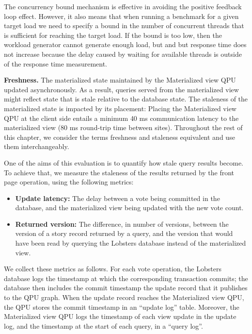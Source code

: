 The concurrency bound mechanism is effective in avoiding the positive feedback loop effect.
However, it also means that when running a benchmark for a given target load we need to specify a bound in the number of
concurrent threads that is sufficient for reaching the target load.
If the bound is too low, then the workload generator cannot generate enough load, but and but response time does not
increase because the delay caused by waiting for available threads is outside of the response time measurement.

\bigskip
\noindent
\textbf{Freshness.} The materialized state maintained by the Materialized view QPU updated asynchronously.
As a result, queries served from the materialized view might reflect state that is stale relative to the database state.
The staleness of the materialized state is impacted by its placement:
Placing the Materialized view QPU at the client side entails a minimum 40 ms communication latency to the materialized view
(80 ms round-trip time between sites).
Throughout the rest of this chapter, we consider the terms freshness and staleness equivalent and use them interchangeably.

One of the aims of this evaluation is to quantify how stale query results become.
To achieve that, we measure the staleness of the results returned by the front page operation,
using the following metrics:
\begin{itemize}
  \item \textbf{Update latency:} The delay between a vote being committed in the database, and the materialized view being
  updated with the new vote count.
  \item \textbf{Returned version:} The difference, in number of versions, between the version of a story record returned by a query,
  and the version that would have been read by querying the Lobsters database instead of the materialized view.
\end{itemize}

We collect these metrics as follows.
For each vote operation, the Lobsters database logs the timestamp at which the corresponding transaction commits;
the database then includes the commit timestamp the update record that it publishes to the QPU graph.
When the update record reaches the Materialized view QPU, the QPU stores the commit timestamp in an
``update log'' table.
Moreover, the Materialized view QPU logs the timestamp of each view update in the update log,
and the timestamp at the start of each query, in a ``query log''.

